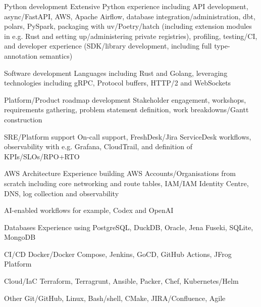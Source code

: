 

\begin{cvskillsnoncentered}

\cvskill
  {Python development}
  {Extensive Python experience including API development, async/FastAPI, AWS, Apache Airflow, database integration/administration, dbt, polars, PySpark, packaging with uv/Poetry/hatch (including extension modules in e.g. Rust and setting up/administering private registries), profiling, testing/CI, and developer experience (SDK/library development, including full type-annotation semantics)}

\cvskill
  {Software development}
  {Languages including Rust and Golang, leveraging technologies including gRPC, Protocol buffers, HTTP/2 and WebSockets}

\cvskill
  {Platform/Product roadmap development}
  {Stakeholder engagement, workshops, requirements gathering, problem statement definition, work breakdowns/Gantt construction}

\cvskill
  {SRE/Platform support}
  {On-call support, FreshDesk/Jira ServiceDesk workflows, observability with e.g. Grafana, CloudTrail, and definition of KPIs/SLOs/RPO+RTO}

\cvskill
  {AWS Architecture}
  {Experience building AWS Accounts/Organisations from scratch including core networking and route tables, IAM/IAM Identity Centre, DNS, log collection and observability}

\cvskill
  {AI-enabled workflows}
  {for example, Codex and OpenAI}

\cvskill
  {Databases}
  {Experience using  PostgreSQL, DuckDB, Oracle, Jena Fuseki, SQLite, MongoDB}

\cvskill
  {CI/CD}
  {Docker/Docker Compose, Jenkins, GoCD, GitHub Actions, JFrog Platform}

\cvskill
  {Cloud/IaC}
  {Terraform, Terragrunt, Ansible, Packer, Chef, Kubernetes/Helm}

\cvskill
  {Other}
  {Git/GitHub, Linux, Bash/shell, CMake, JIRA/Confluence, Agile}

\end{cvskillsnoncentered}


